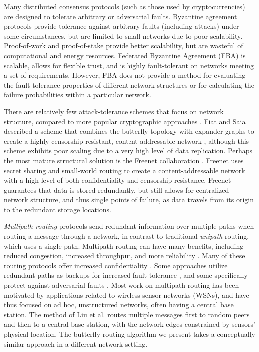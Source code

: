 \documentclass{sig-alternate-05-2015}
\begin{document}
Many distributed consensus protocols (such as those used by cryptocurrencies)
are designed to tolerate arbitrary or adversarial faults.
Byzantine agreement protocols
\cite{lamport_byzantine_1982,castro_practical_1999}
provide tolerance against arbitrary faults (including attacks) under
some circumstances, but are limited to small networks due to poor scalability.
Proof-of-work \cite{dwork_pricing_1993,nakamoto_bitcoin:_2008}
and proof-of-stake \cite{king_ppcoin:_2012}
provide better scalability,
but are wasteful of computational and energy resources.
Federated Byzantine Agreement (FBA) \cite{mazieres_stellar_2015}
is scalable, allows for flexible trust,
and is highly fault-tolerant on networks meeting a set of requirements.
However, FBA does not provide a method for evaluating the
fault tolerance properties of different network structures
or for calculating the failure probabilities within a particular network.

There are relatively few attack-tolerance schemes
that focus on network structure,
compared to more popular cryptographic approaches
\cite{ferguson_practical_2003}.
Fiat and Saia described a scheme that combines the butterfly topology
with expander graphs to create a highly censorship-resistant,
content-addressable network \cite{fiat_censorship_2002},
although this scheme exhibits poor scaling due to a very high level of data
replication.
Perhaps the most mature structural solution is the Freenet collaboration
\cite{clarke_freenet:_2001}.
Freenet uses secret sharing
\cite{shamir_how_1979, blakley_safeguarding_1979}
and small-world routing
\cite{zhang_using_2002,kleinberg_small-world_2000}
to create a content-addressable network with a high level of both
confidentiality and censorship resistance.
Freenet guarantees that data is stored redundantly,
but still allows for centralized network structure,
and thus single points of failure,
as data travels from its origin to the redundant storage locations.

{\em Multipath routing} protocols send redundant information
over multiple paths when routing a message through a network,
in contrast to traditional {\em unipath} routing, which uses
a single path.
Multipath routing can have many benefits, including reduced congestion,
increased throughput, and more reliability
\cite{qadir_exploiting_2015}.
Many of these routing protocols offer increased confidentiality
\cite{zin_survey_2015}.
Some approaches utilize redundant paths as backups for increased
fault tolerance
\cite{alrajeh_secure_2013},
and some specifically protect against adversarial faults
\cite{kohno_improvement_2012, khalil_unmask:_2010, lou_h-spread:_2006}.
Most work on multipath routing has been motivated by applications related to
wireless sensor networks (WSNs),
and have thus focused on ad hoc, unstructured networks, often having a central
base station.
The method of Liu et al.
\cite{liu_secure_2012}
routes multiple messages first to random peers and then
to a central base station,
with the network edges constrained by sensors' physical location.
The butterfly routing algorithm we present takes a conceptually similar
approach in a different network setting.
\end{document}
